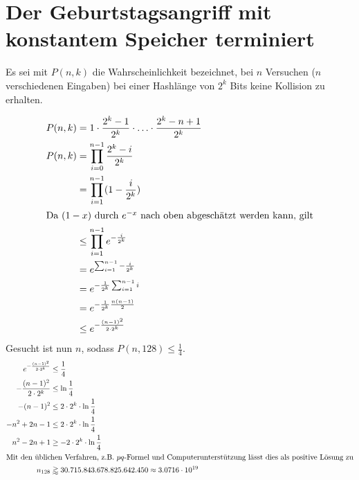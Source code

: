 \documentclass{../crypto}
\date{4. Dezember 2015}
\begin{document}
\maketitle

\section{Der Geburtstagsangriff mit konstantem Speicher terminiert}

Es sei mit $P(n,k)$ die Wahrscheinlichkeit bezeichnet, bei $n$ Versuchen ($n$
verschiedenen Eingaben) bei einer Hashlänge von $2^k$ Bits keine Kollision zu
erhalten.

\begin{align*}
   P(n,k)  & = 1 \cdot \frac{2^k - 1}{2^k} \cdot \ldots \cdot \frac{2^k - n + 1}{2^k} \\
   P(n,k)  & =   \prod_{i=0}^{n-1} \frac{2^k - i}{2^k}                                \\
           & =   \prod_{i=1}^{n-1} (1 -  \frac{i}{2^k})                               \\
\intertext{Da $(1-x)$ durch $e^{-x}$ nach oben abgeschätzt werden kann, gilt}
           & \le \prod_{i=1}^{n-1} e^{-\frac{i}{2^k}} \\
           & =   e^{\sum_{i=1}^{n-1}-\frac{i}{2^k}}   \\
           & =   e^{-\frac{1}{2^k}\sum_{i=1}^{n-1}i}  \\
           & =   e^{-\frac{1}{2^k} \frac{n(n-1)}{2}}  \\
           & \le   e^{-\frac{(n-1)^2}{2\cdot 2^k}}    \\
\end{align*}
Gesucht ist nun $n$, sodass $P(n,128) \le \frac{1}{4}$.
\begin{align*}
   e^{-\frac{(n-1)^2}{2\cdot 2^k}} & \le \frac{1}{4}                        \\
   -\frac{(n-1)^2}{2\cdot 2^k}     & \le \ln{\frac{1}{4}}                   \\
   -(n-1)^2                        & \le 2\cdot 2^k \cdot \ln{\frac{1}{4}}  \\
   -n^2 + 2n - 1                   & \le 2\cdot 2^k \cdot \ln{\frac{1}{4}}  \\
   n^2 - 2n + 1                    & \ge -2\cdot 2^k \cdot \ln{\frac{1}{4}} \\
   \intertext{Mit den üblichen Verfahren, z.B. $pq$-Formel und
   Computerunterstützung lässt dies als positive Lösung zu}
   n_{128}                         & \gtrapprox 30.715.843.678.825.642.450 \approx 3.0716 \cdot 10^{19}
\end{align*}
\end{document}

